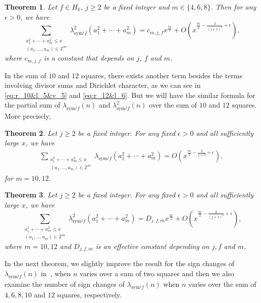 \documentclass[10pt]{amsart}
\newtheorem{theorem}{Theorem}
\begin{document}
\begin{theorem} \label{thm:main1(468)}
        Let $f \in H_k$, $j \geq 2$ be a fixed integer and $ m \in \{4,6,8\}$. Then for any $\epsilon > 0$, we have 
         $$\sum_{\substack{a_{1}^{2}+\cdots+a_{m}^{2} \leq x \\ (a_{1},\ldots,a_{m})\in\mathbb{Z}^{m}}}\lambda_{\mathrm{sym}^jf}^2(a_{1}^{2}+\cdots+a_{m}^{2}) = c_{m,j,f}x^\frac{m}{2} + O\left( x^{\frac{m}{2}-\frac{2}{(j+1)^2}+\epsilon} \right),$$ where $c_{m,j,f}$ is a constant that depends on $j$, $f$ and $m$.
\end{theorem}

In the sum of $10$ and $12$ squares, there exists another term besides the terms involving divisor sums and Dirichlet character, as we can see in \eqref{eq:r_10&l_5&v_5} and \eqref{eq:r_12&l_6}. But we will have the similar formula for the partial sum of $\lambda_{\mathrm{sym}^jf}(n)$ and $\lambda_{\mathrm{sym}^jf}^2(n)$ over the sum of $10$ and $12$ squares. More precisely, 

\begin{theorem} \label{thm:main(10,12)}
Let $j\geq 2$ be a fixed integer. For any fixed $\epsilon>0$ and all sufficiently large $x$, we have
\begin{align}
\sum_{\substack{a_{1}^{2}+\cdots+a_{m}^{2}\leq x \\ (a_{1},\ldots,a_{m})\in\mathbb{Z}^{m}}}\lambda_{\mathrm{sym}^{j}f}(a_{1}^{2}+\cdots+a_{m}^{2})=O\left(x^{\frac{m}{2}-\frac{2}{j+3}+\epsilon}\right),
\end{align}
for $m = 10,12$.
\end{theorem}

\begin{theorem} \label{thm:main1(10,12)}
Let $j\geq 2$ be a fixed integer. For any fixed $\epsilon>0$ and all sufficiently large $x$, we have
\[
\sum_{\substack{a_{1}^{2}+\cdots+a_{m}^{2}\leq x \\ (a_{1},\ldots,a_{m})\in\mathbb{Z}^{m}}}\lambda_{\mathrm{sym}^{j}f}^2(a_{1}^{2}+\cdots+a_{m}^{2})= D_{j,f,m}x^\frac{m}{2}+O\left(x^{\frac{m}{2}-\frac{2}{(j+1)^2}+\epsilon}\right),
\]
where $m=10,12$ and $D_{j,f,m}$ is an effective constant depending on $j,f$ and $m$. 
\end{theorem}


In the next theorem, we slightly improve the result for the sign changes of $\lambda_{\mathrm{sym}^jf}(n)$ in~\cite{Kaur2026}, when $n$ varies over a sum of two squares and then we also examine the number of sign changes of  $\lambda_{\mathrm{sym}^jf}(n)$ when $n$ varies over the sum of $4,6,8,10$ and $12$ squares, respectively.
\end{document}
